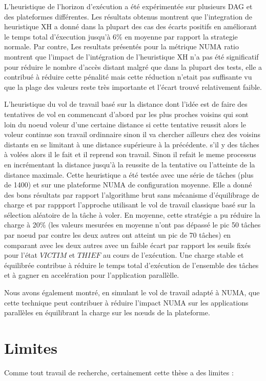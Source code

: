 %
L'heuristique de l'horizon d'exécution a été expérimentée sur plusieurs DAG et des plateformes différentes. 
Les résultats obtenus montrent que l'integration de heuristique XH a donné dans la plupart des cas des écarts positifs en améliorant le temps total d'éxecution jusqu'à 6\% en moyenne par rapport la strategie normale. Par contre, Les resultats présentés pour la métrique NUMA ratio montrent que l'impact de l'intégration de l'heuristique XH n'a pas été significatif pour réduire le nombre d'accès distant malgré que dans la plupart des tests, elle a contribué à réduire cette pénalité mais cette réduction n'etait pas suffisante vu que la plage des valeurs reste très importante et l'écart trouvé relativement faible.

%
L'heuristique du vol de travail basé sur la distance dont l'idée est de faire des tentatives de vol en commencant d'abord par les plus proches voisins qui sont loin du noeud voleur d'une certaine distance si cette tentative reussit alors le voleur continue son travail ordinnaire sinon il va chercher ailleurs chez des voisins distants en se limitant à une distance supérieure à la précédente. s'il y des tâches à volées alors il le fait et il reprend son travail. Sinon il refait le meme processus en incrémentant la distance jusqu'à la reussite de la tentative ou l'atteinte de la distance maximale. Cette heuristique a été testée avec une série de tâches (plus de 1400) et sur une plateforme NUMA de configuration moyenne. Elle a donné des  bons résultats par rapport l'algorithme brut sans mécanisme d'équilibrage de charge et par rappport l'approche utilisant le vol de travail classique basé sur la sélection aléatoire de la tâche à voler. En moyenne, cette stratégie a pu réduire la charge à 20\% (les valeurs mesurées en moyenne n'ont pas dépassé le pic 50 tâches par noeud par contre les deux autres ont atteint un pic de 70 tâches) en comparant avec les deux autres avec un faible écart par rapport les seuils fixés pour l'état $VICTIM$ et $THIEF$ au cours de l'exécution. Une charge stable et équilibrée contribue à réduire le temps total d'exécution de l'ensemble des tâches et à gagner en accelération pour l'application parallèlle.

Nous avons également montré, en simulant le vol de travail adapté à NUMA, que cette technique peut contribuer à réduire l'impact NUMA sur les applications parallèles en équilibrant la charge sur les nœuds de la plateforme.
%
\section{Limites}
%
Comme tout travail de recherche, certainement cette thèse a des limites : 

